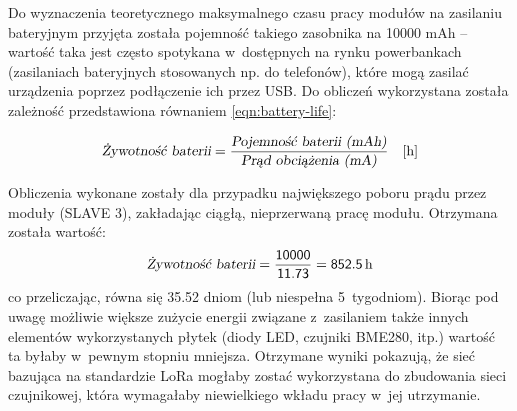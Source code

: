 Do wyznaczenia teoretycznego maksymalnego czasu pracy modułów na zasilaniu bateryjnym przyjęta została pojemność takiego
zasobnika na 10000 mAh -- wartość taka jest często spotykana w~dostępnych na rynku powerbankach (zasilaniach
bateryjnych stosowanych np. do telefonów), które mogą zasilać urządzenia poprzez podłączenie ich przez USB. Do obliczeń
wykorzystana została zależność przedstawiona równaniem \ref{eqn:battery-life}:

\begin{equation}\label{eqn:battery-life}
    \textsl{Żywotność baterii} = \frac{\textsl{Pojemność baterii (mAh)}}{\textsl{Prąd obciążenia (mA)}}\quad\text{[h]}
\end{equation}

Obliczenia wykonane zostały dla przypadku największego poboru prądu przez moduły (SLAVE 3), zakładając ciągłą,
nieprzerwaną pracę modułu. Otrzymana została wartość:
\begin{equation*}
    \textsl{Żywotność baterii} = \mathsf{\frac{10000}{11.73}} = \mathsf{852.5}\,\text{h}
\end{equation*}
co przeliczając, równa się 35.52 dniom (lub niespełna 5~tygodniom). Biorąc pod uwagę możliwie większe zużycie energii
związane z~zasilaniem także innych elementów wykorzystanych płytek (diody LED, czujniki BME280, itp.) wartość ta byłaby
w~pewnym stopniu mniejsza. Otrzymane wyniki pokazują, że sieć bazująca na standardzie LoRa mogłaby zostać wykorzystana
do zbudowania sieci czujnikowej, która wymagałaby niewielkiego wkładu pracy w~jej utrzymanie.